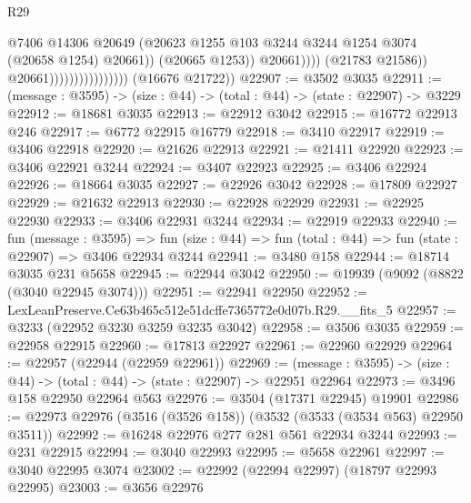 \begin{lexlean}{R29}
\begin{coremodule}
                                                    @7406
                                                    @14306
                                                    @20649
                                                    (@20623
                                                      @1255
                                                      @103
                                                      @3244
                                                      @3244
                                                      @1254
                                                      @3074
                                                      (@20658 @1254)
                                                      @20661))
                                                  (@20665 @1253))
                                                @20661))))
                                        (@21783 @21586))
                                      @20661))))))))))))))))
      (@16676 @21722))
@22907 := @3502 @3035
@22911 := (message : @3595) -> (size : @44) -> (total : @44) -> (state : @22907) -> @3229
@22912 := @18681 @3035
@22913 := @22912 @3042
@22915 := @16772 @22913 @246
@22917 := @6772 @22915 @16779
@22918 := @3410 @22917
@22919 := @3406 @22918
@22920 := @21626 @22913
@22921 := @21411 @22920
@22923 := @3406 @22921 @3244
@22924 := @3407 @22923
@22925 := @3406 @22924
@22926 := @18664 @3035
@22927 := @22926 @3042
@22928 := @17809 @22927
@22929 := @21632 @22913
@22930 := @22928 @22929
@22931 := @22925 @22930
@22933 := @3406 @22931 @3244
@22934 := @22919 @22933
@22940 := fun (message : @3595) =>
  fun (size : @44) => fun (total : @44) => fun (state : @22907) => @3406 @22934 @3244
@22941 := @3480 @158
@22944 := @18714 @3035 @231 @5658
@22945 := @22944 @3042
@22950 := @19939 (@9092 (@8822 (@3040 @22945 @3074)))
@22951 := @22941 @22950
@22952 := LexLeanPreserve.Ce63b465c512e51dcffe7365772e0d07b.R29.__fits_5
@22957 := @3233 (@22952 @3230 @3259 @3235 @3042)
@22958 := @3506 @3035
@22959 := @22958 @22915
@22960 := @17813 @22927
@22961 := @22960 @22929
@22964 := @22957 (@22944 (@22959 @22961))
@22969 := (message : @3595) -> (size : @44) -> (total : @44) -> (state : @22907) -> @22951 @22964
@22973 := @3496 @158 @22950 @22964 @563
@22976 := @3504 (@17371 @22945) @19901
@22986 := @22973 @22976 (@3516 (@3526 @158)) (@3532 (@3533 (@3534 @563) @22950 @3511))
@22992 := @16248 @22976 @277 @281 @561 @22934 @3244
@22993 := @231 @22915
@22994 := @3040 @22993
@22995 := @5658 @22961
@22997 := @3040 @22995 @3074
@23002 := @22992 (@22994 @22997) (@18797 @22993 @22995)
@23003 := @3656 @22976

\end{coremodule}
\end{lexlean}
